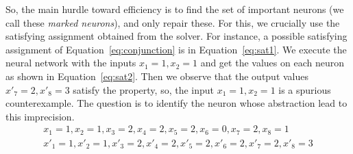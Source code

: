 So, the main hurdle toward efficiency is to find the set of important neurons (we call these {\em marked neurons}), 
and only repair these.  For this, we crucially use the satisfying assignment obtained from the \milp{} solver.
For instance, a possible satisfying assignment of Equation~\ref{eq:conjunction}
is in Equation~\ref{eq:sat1}. We execute the neural network with the inputs $x_1=1,x_2=1$ and get the values 
on each neuron as shown in Equation~\ref{eq:sat2}. 
Then we observe that the output values $x'_7=2, x'_8=3$ satisfy the property, 
so, the input $x_1=1, x_2=1$ is a spurious counterexample. 
The question is to identify the neuron whose abstraction lead to this imprecision.
\setcounter{equation}{2}
\begin{align}
  x_1=1, x_2=1, x_3=2, x_4=2, x_5=2, x_6=0, x_7=2, x_8=1 \label{eq:sat1} \\
  x'_1=1, x'_2=1, x'_3=2, x'_4=2, x'_5=2, x'_6=2, x'_7=2, x'_8=3 \label{eq:sat2}
\end{align}






